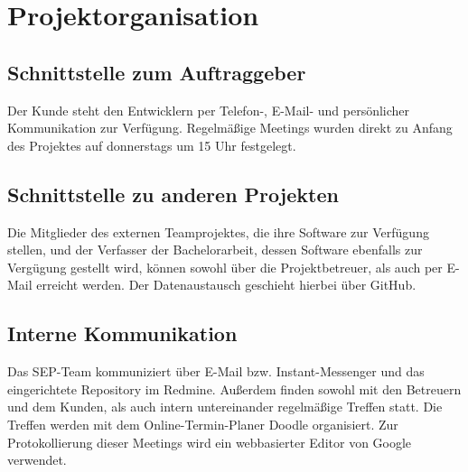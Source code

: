 
\chapter{Projektorganisation}

\section{Schnittstelle zum Auftraggeber}

Der Kunde steht den Entwicklern per Telefon-, E-Mail- und pers\"onlicher Kommunikation zur Verf\"ugung. Regelm\"a{\ss}ige
Meetings wurden direkt zu Anfang des Projektes auf donnerstags um 15 Uhr festgelegt.


\section{Schnittstelle zu anderen Projekten}

Die Mitglieder des externen Teamprojektes, die ihre Software zur Verf\"ugung stellen, und der Verfasser 
der Bachelorarbeit, dessen Software ebenfalls zur Verg\"ugung gestellt wird, k\"onnen sowohl \"uber die 
Projektbetreuer, als auch per E-Mail erreicht werden. 
Der Datenaustausch geschieht hierbei \"uber GitHub.

\section{Interne Kommunikation}

Das SEP-Team kommuniziert \"uber E-Mail bzw. Instant-Messenger und das eingerichtete Repository im Redmine.
Au{\ss}erdem finden sowohl mit den Betreuern und dem Kunden, als auch intern untereinander regelm\"a{\ss}ige Treffen statt.
Die Treffen werden mit dem Online-Termin-Planer Doodle organisiert.
Zur Protokollierung dieser Meetings wird ein webbasierter Editor von Google verwendet.



	
	